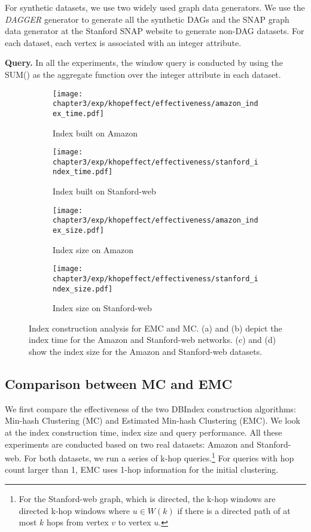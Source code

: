 For synthetic datasets, we use two widely used graph data generators. 
We use the \emph{DAGGER} generator \cite{yildirim2013dagger} to generate 
all the synthetic DAGs and the SNAP graph data generator at the
Stanford SNAP website to generate non-DAG datasets. For each dataset, each vertex is associated with an integer attribute.

\textbf{Query.} In all the experiments, the window query is conducted 
by using the SUM() as the aggregate function over the integer attribute in each dataset. 

\begin{figure*}[t]
\centering
\begin{subfigure}{0.45\textwidth}
  \texttt{[image: chapter3/exp/khopeffect/effectiveness/amazon\_index\_time.pdf]}
  \caption{Index built on Amazon}
\end{subfigure}
\begin{subfigure}{0.45\textwidth}
  \texttt{[image: chapter3/exp/khopeffect/effectiveness/stanford\_index\_time.pdf]}
  \caption{Index built on Stanford-web}
\end{subfigure}

\begin{subfigure}{0.45\textwidth}
  \texttt{[image: chapter3/exp/khopeffect/effectiveness/amazon\_index\_size.pdf]}
  \caption{Index size on Amazon}
\end{subfigure}
\begin{subfigure}{0.45\textwidth}
  \texttt{[image: chapter3/exp/khopeffect/effectiveness/stanford\_index\_size.pdf]}
  \caption{Index size on Stanford-web}
\end{subfigure}
\caption{Index construction analysis for EMC and MC. (a) and (b) 
depict the index time for the Amazon and Stanford-web networks.
(c) and (d) show the index size for the Amazon and Stanford-web datasets.}
\label{fig:index_analysis_emc_mc}
\end{figure*}


\subsection{Comparison between MC and EMC}\label{sec:mc_vs_emc}
We first compare the effectiveness of the two DBIndex 
construction algorithms: Min-hash Clustering (MC) and Estimated 
Min-hash Clustering (EMC). We look at 
the index construction time, index size and query performance. 
All these experiments are conducted based on two real datasets: 
Amazon and Stanford-web. For both datasets, we run a series of k-hop queries.\footnote{For the Stanford-web graph, which is directed,
the k-hop windows are directed k-hop windows where $u \in W(k)$ if there is a directed path
of at most $k$ hops from vertex $v$ to vertex $u$.
} For queries with hop count larger than 1, 
EMC uses 1-hop information for the initial clustering. 

